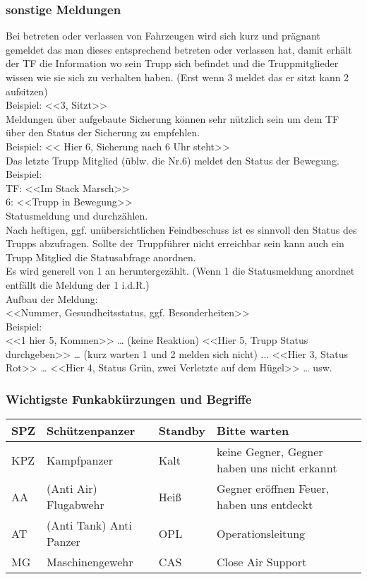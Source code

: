 \subsubsection{sonstige Meldungen}
	Bei betreten oder verlassen von Fahrzeugen wird sich kurz und prägnant gemeldet das man dieses entsprechend betreten oder verlassen hat, damit erhält der TF die Information wo sein Trupp sich befindet und die Truppmitglieder wissen wie sie sich zu verhalten haben. (Erst wenn 3 meldet das er sitzt kann 2 aufsitzen) \\
	Beispiel:  <<3, Sitzt>> \\

	Meldungen über aufgebaute Sicherung können sehr nützlich sein um dem TF über den Status der Sicherung zu empfehlen. \\
	Beispiel: << Hier 6, Sicherung nach 6 Uhr steht>> \\

	Das letzte Trupp Mitglied (üblw. die Nr.6) meldet den Status der Bewegung. \\
	Beispiel: \\
	TF: <<Im Stack Marsch>> \\
	6: <<Trupp in Bewegung>>  \\
	Statusmeldung und durchzählen. \\
	Nach heftigen, ggf. unübersichtlichen Feindbeschuss ist es sinnvoll den Status des Trupps abzufragen. Sollte der Truppführer nicht erreichbar sein kann auch ein Trupp Mitglied die Statusabfrage anordnen. \\
	Es wird generell von 1 an heruntergezählt. (Wenn 1 die Statusmeldung  anordnet entfällt die Meldung der 1 i.d.R.)  \\
	Aufbau der Meldung: \\
	<<Nummer, Gesundheitsstatus, ggf. Besonderheiten>>  \\
	Beispiel:\\
	 <<1 hier 5, Kommen>> … (keine Reaktion)  <<Hier 5, Trupp Status durchgeben>> … (kurz warten 1 und 2 melden sich nicht) ... <<Hier 3, Status Rot>> … <<Hier 4, Status Grün, zwei Verletzte auf dem Hügel>> … usw. \\

\subsubsection{Wichtigste Funkabkürzungen und Begriffe}
	\begin{tabular}{|p{2cm}|p{4cm}|p{3cm}|p{4cm}|} \hline
		SPZ &	Schützenpanzer	& Standby &	Bitte warten \\ \hline 
		KPZ	 & Kampfpanzer	& Kalt	& keine Gegner, Gegner haben uns nicht erkannt \\ \hline
		AA	& (Anti Air) Flugabwehr	& Heiß &	Gegner eröffnen Feuer, haben uns entdeckt \\ \hline
		AT	& (Anti Tank) Anti Panzer	& OPL	& Operationsleitung \\ \hline
		MG	& Maschinengewehr	& CAS	& Close Air Support \\ \hline
	\end{tabular}


